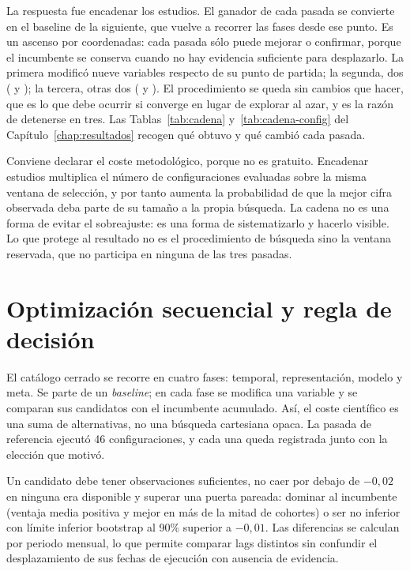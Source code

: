 La respuesta fue encadenar los estudios. El ganador de cada pasada se convierte en el baseline de la
siguiente, que vuelve a recorrer las fases desde ese punto. Es un ascenso por coordenadas: cada
pasada sólo puede mejorar o confirmar, porque el incumbente se conserva cuando no hay evidencia
suficiente para desplazarlo. La primera modificó nueve variables respecto de su punto de partida; la
segunda, dos ( y ); la
tercera, otras dos ( y ). El
procedimiento se queda sin cambios
que hacer, que es lo que debe ocurrir si converge en lugar de explorar al azar, y es la razón de
detenerse en tres. Las Tablas~\ref{tab:cadena} y~\ref{tab:cadena-config} del
Capítulo~\ref{chap:resultados} recogen qué obtuvo y qué cambió cada pasada.

Conviene declarar el coste metodológico, porque no es gratuito. Encadenar estudios multiplica el
número de configuraciones evaluadas sobre la misma ventana de selección, y por tanto aumenta la
probabilidad de que la mejor cifra observada deba parte de su tamaño a la propia búsqueda. La cadena
no es una forma de evitar el sobreajuste: es una forma de sistematizarlo y hacerlo visible. Lo que
protege al resultado no es el procedimiento de búsqueda sino la ventana reservada, que no participa
en ninguna de las tres pasadas.

\section{Optimización secuencial y regla de decisión}

El catálogo cerrado se recorre en cuatro fases: temporal, representación, modelo y meta. Se parte
de un \textit{baseline}; en cada fase se modifica una variable y se comparan sus candidatos con el
incumbente acumulado. Así, el coste científico es una suma de alternativas, no una búsqueda
cartesiana opaca. La pasada de referencia ejecutó 46 configuraciones, y cada una queda registrada
junto con la elección que motivó.

Un candidato debe tener observaciones suficientes, no caer por debajo de $-0,02$ en ninguna era
disponible y superar una puerta pareada: dominar al incumbente (ventaja media positiva y mejor en
más de la mitad de cohortes) o ser no inferior con límite inferior bootstrap al 90\% superior a
$-0,01$. Las diferencias se calculan por periodo mensual, lo que permite comparar lags distintos
sin confundir el desplazamiento de sus fechas de ejecución con ausencia de evidencia.

